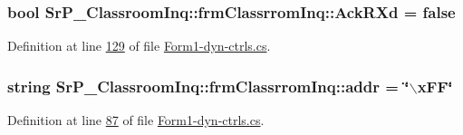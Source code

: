 \hypertarget{class_sr_p___classroom_inq_1_1frm_classrrom_inq_a65b6633a5bc7bff8142fcace6bfba3f8}{
\subsubsection[{\-Ack\-R\-Xd}]{\setlength{\rightskip}{0pt plus 5cm}bool {\bf \-Sr\-P\-\_\-\-Classroom\-Inq\-::frm\-Classrrom\-Inq\-::\-Ack\-R\-Xd} = false}}
\label{class_sr_p___classroom_inq_1_1frm_classrrom_inq_a65b6633a5bc7bff8142fcace6bfba3f8}


\-Definition at line \hyperlink{_form1-dyn-ctrls_8cs_source_l00129}{129} of file \hyperlink{_form1-dyn-ctrls_8cs_source}{\-Form1-\/dyn-\/ctrls.\-cs}.

\hypertarget{class_sr_p___classroom_inq_1_1frm_classrrom_inq_ab99245163109493292f36ab5011c4f76}{
\subsubsection[{addr}]{\setlength{\rightskip}{0pt plus 5cm}string {\bf \-Sr\-P\-\_\-\-Classroom\-Inq\-::frm\-Classrrom\-Inq\-::addr} = \char`\"{}$\backslash$x\-F\-F\char`\"{}}}
\label{class_sr_p___classroom_inq_1_1frm_classrrom_inq_ab99245163109493292f36ab5011c4f76}


\-Definition at line \hyperlink{_form1-dyn-ctrls_8cs_source_l00087}{87} of file \hyperlink{_form1-dyn-ctrls_8cs_source}{\-Form1-\/dyn-\/ctrls.\-cs}.

